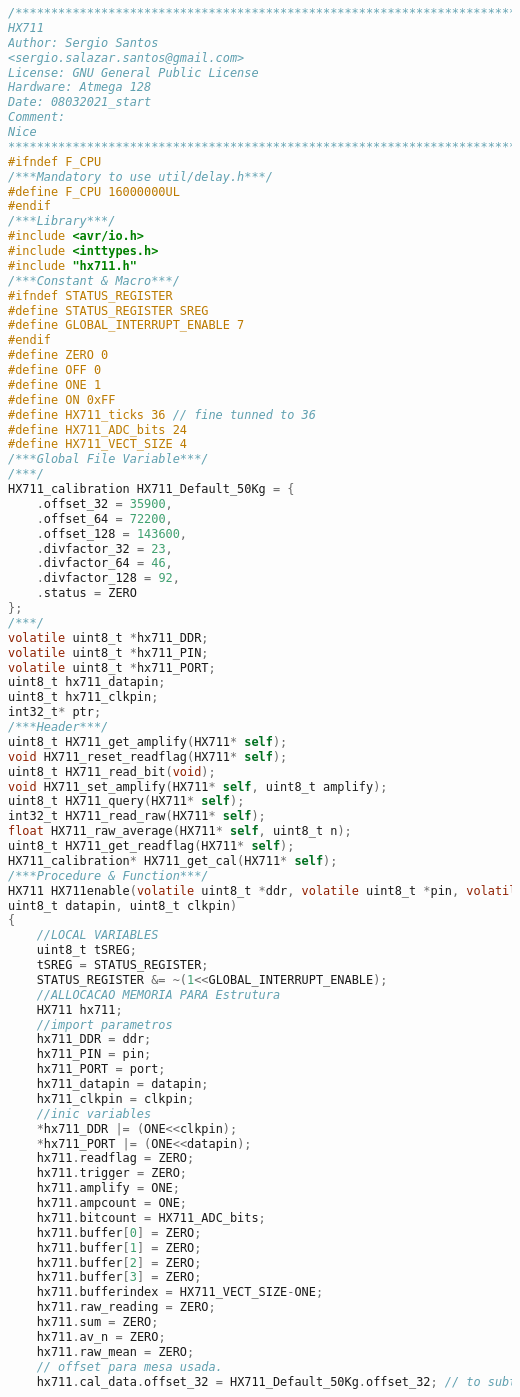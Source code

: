 \begin{lstlisting}[language=C, caption={hx711.c}, label=hx711-c, captionpos=b]
/*************************************************************************
HX711
Author: Sergio Santos
<sergio.salazar.santos@gmail.com>
License: GNU General Public License     
Hardware: Atmega 128
Date: 08032021_start
Comment:
Nice
************************************************************************/
#ifndef F_CPU
/***Mandatory to use util/delay.h***/
#define F_CPU 16000000UL
#endif
/***Library***/
#include <avr/io.h>
#include <inttypes.h>
#include "hx711.h"
/***Constant & Macro***/
#ifndef STATUS_REGISTER
#define STATUS_REGISTER SREG
#define GLOBAL_INTERRUPT_ENABLE 7
#endif
#define ZERO 0
#define OFF 0
#define ONE 1
#define ON 0xFF
#define HX711_ticks 36 // fine tunned to 36
#define HX711_ADC_bits 24
#define HX711_VECT_SIZE 4
/***Global File Variable***/
/***/
HX711_calibration HX711_Default_50Kg = {
	.offset_32 = 35900,
	.offset_64 = 72200,
	.offset_128 = 143600,
	.divfactor_32 = 23,
	.divfactor_64 = 46,
	.divfactor_128 = 92,
	.status = ZERO
};
/***/
volatile uint8_t *hx711_DDR;
volatile uint8_t *hx711_PIN;
volatile uint8_t *hx711_PORT;
uint8_t hx711_datapin;
uint8_t hx711_clkpin;
int32_t* ptr;
/***Header***/
uint8_t HX711_get_amplify(HX711* self);
void HX711_reset_readflag(HX711* self);
uint8_t HX711_read_bit(void);
void HX711_set_amplify(HX711* self, uint8_t amplify);
uint8_t HX711_query(HX711* self);
int32_t HX711_read_raw(HX711* self);
float HX711_raw_average(HX711* self, uint8_t n);
uint8_t HX711_get_readflag(HX711* self);
HX711_calibration* HX711_get_cal(HX711* self);
/***Procedure & Function***/
HX711 HX711enable(volatile uint8_t *ddr, volatile uint8_t *pin, volatile uint8_t *port, 
uint8_t datapin, uint8_t clkpin)
{
	//LOCAL VARIABLES
	uint8_t tSREG;
	tSREG = STATUS_REGISTER;
	STATUS_REGISTER &= ~(1<<GLOBAL_INTERRUPT_ENABLE);
	//ALLOCACAO MEMORIA PARA Estrutura
	HX711 hx711;
	//import parametros
	hx711_DDR = ddr;
	hx711_PIN = pin;
	hx711_PORT = port;
	hx711_datapin = datapin;
	hx711_clkpin = clkpin;
	//inic variables
	*hx711_DDR |= (ONE<<clkpin);
	*hx711_PORT |= (ONE<<datapin);
	hx711.readflag = ZERO;
	hx711.trigger = ZERO;
	hx711.amplify = ONE;
	hx711.ampcount = ONE;
	hx711.bitcount = HX711_ADC_bits;
	hx711.buffer[0] = ZERO;
	hx711.buffer[1] = ZERO;
	hx711.buffer[2] = ZERO;
	hx711.buffer[3] = ZERO;
	hx711.bufferindex = HX711_VECT_SIZE-ONE;
	hx711.raw_reading = ZERO;
	hx711.sum = ZERO;
	hx711.av_n = ZERO;
	hx711.raw_mean = ZERO;
	// offset para mesa usada.
	hx711.cal_data.offset_32 = HX711_Default_50Kg.offset_32; // to subtract B

\end{lstlisting}
